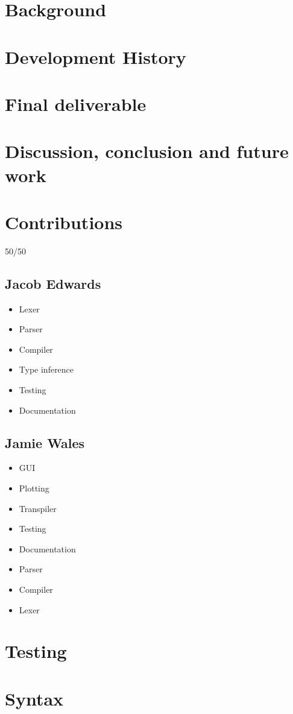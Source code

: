 \documentclass[a4paper, oneside, 11pt]{report}
\begin{document}
\chapter{Background}\label{ch:background}

\chapter{Development History}\label{ch:devhist}



\chapter{Final deliverable}\label{ch:impl}



\chapter{Discussion, conclusion and future work}\label{ch:discussion-conclusion-and-future-work}




\appendix
\chapter{Contributions}\label{ch:contributions}

50/50

\section{Jacob Edwards}\label{sec:jacob-edwards}

\begin{itemize}
    \item Lexer
    \item Parser
    \item Compiler
    \item Type inference
    \item Testing
    \item Documentation
\end{itemize}

\section{Jamie Wales}\label{sec:jamie-wales}

\begin{itemize}
    \item GUI
    \item Plotting
    \item Transpiler
    \item Testing
    \item Documentation
    \item Parser
    \item Compiler
    \item Lexer
\end{itemize}

\chapter{Testing}\label{ch:test}



\chapter{Syntax}\label{ch:other-stuff}
\end{document}
